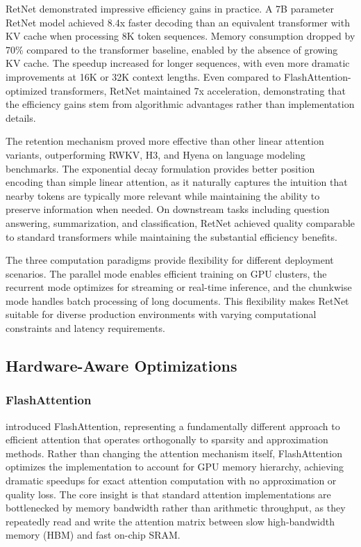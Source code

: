 RetNet demonstrated impressive efficiency gains in practice. A 7B parameter RetNet model achieved 8.4x faster decoding than an equivalent transformer with KV cache when processing 8K token sequences. Memory consumption dropped by 70\% compared to the transformer baseline, enabled by the absence of growing KV cache. The speedup increased for longer sequences, with even more dramatic improvements at 16K or 32K context lengths. Even compared to FlashAttention-optimized transformers, RetNet maintained 7x acceleration, demonstrating that the efficiency gains stem from algorithmic advantages rather than implementation details.

The retention mechanism proved more effective than other linear attention variants, outperforming RWKV, H3, and Hyena on language modeling benchmarks. The exponential decay formulation provides better position encoding than simple linear attention, as it naturally captures the intuition that nearby tokens are typically more relevant while maintaining the ability to preserve information when needed. On downstream tasks including question answering, summarization, and classification, RetNet achieved quality comparable to standard transformers while maintaining the substantial efficiency benefits.

The three computation paradigms provide flexibility for different deployment scenarios. The parallel mode enables efficient training on GPU clusters, the recurrent mode optimizes for streaming or real-time inference, and the chunkwise mode handles batch processing of long documents. This flexibility makes RetNet suitable for diverse production environments with varying computational constraints and latency requirements.

\subsection{Hardware-Aware Optimizations}

\subsubsection{FlashAttention}

\citet{dao2022flashattention} introduced FlashAttention, representing a fundamentally different approach to efficient attention that operates orthogonally to sparsity and approximation methods. Rather than changing the attention mechanism itself, FlashAttention optimizes the implementation to account for GPU memory hierarchy, achieving dramatic speedups for exact attention computation with no approximation or quality loss. The core insight is that standard attention implementations are bottlenecked by memory bandwidth rather than arithmetic throughput, as they repeatedly read and write the attention matrix between slow high-bandwidth memory (HBM) and fast on-chip SRAM.

